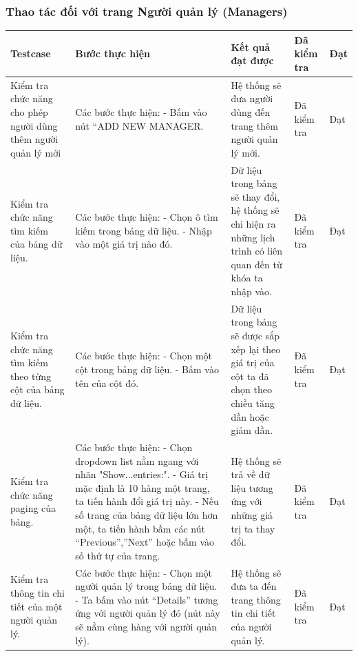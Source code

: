 \documentclass{article}
\begin{document}
\subsubsection{Thao tác đối với trang Người quản lý  (Managers)}
\begin{longtable}{ | p{} |p{} | p{}  | p{}  | p{}  | } 
\hline
\textbf{Testcase}& \textbf{Bước thực hiện}& \textbf{Kết quả đạt được} & \textbf{Đã kiểm tra}& \textbf{Đạt} \\ 
\hline
\hline
Kiểm tra chức năng cho phép người dùng thêm người quản lý mới &
Các bước thực hiện: \newline
- Bấm vào nút “ADD NEW MANAGER.
&
Hệ thống sẽ đưa người dùng đến trang thêm người quản lý mới. &
Đã kiểm tra &
Đạt \\

\hline
Kiểm tra chức năng tìm kiếm của bảng dữ liệu. &
Các bước thực hiện: \newline
- Chọn ô tìm kiếm trong bảng dữ liệu. \newline
- Nhập vào một giá trị nào đó. 
&
Dữ liệu trong bảng sẽ thay đổi, hệ thống sẽ chỉ hiện ra những lịch trình có liên quan đến từ khóa ta nhập vào. &
Đã kiểm tra &
Đạt \\

\hline
Kiểm tra chức năng tìm kiếm theo từng cột của bảng dữ liệu. &
Các bước thực hiện: \newline
- Chọn một cột trong bảng dữ liệu.  \newline
- Bấm vào tên của cột đó. 
&
Dữ liệu trong bảng sẽ được sắp xếp lại theo giá trị của cột ta đã chọn theo chiều tăng dần hoặc giảm dần. &
Đã kiểm tra &
Đạt \\

\hline
Kiểm tra chức năng paging của bảng. &
Các bước thực hiện: \newline
- Chọn dropdown list nằm ngang với nhãn "Show...entries:".   \newline
- Giá trị mặc định là 10 hàng một trang, ta tiến hành đổi giá trị này. \newline
- Nếu số trang của bảng dữ liệu lớn hơn một, ta tiến hành bầm các nút “Previous”,”Next” hoặc bấm vào số thứ tự của trang.
&
Hệ thống sẽ trả về dữ liệu tương ứng với những giá trị ta thay đổi. &
Đã kiểm tra &
Đạt \\

\hline
Kiểm tra thông tin chi tiết của một người quản lý. &
Các bước thực hiện: \newline
- Chọn một người quản lý trong bảng dữ liệu.    \newline
- Ta bấm vào nút “Details” tương ứng với người quản lý đó (nút này sẽ nằm cùng hàng với người quản lý).  
&
Hệ thống sẽ đưa ta đến trang thông tin chi tiết của người quản lý. &
Đã kiểm tra &
Đạt \\


\end{longtable}
\end{document}
